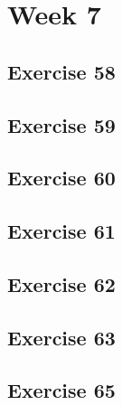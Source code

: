 \documentclass[a4paper]{article}
\let\stdsection\section
\renewcommand\section{\newpage\stdsection}
\begin{document}
\section*{Week 7}

\subsection*{Exercise 58}




\newpage
\subsection*{Exercise 59}


\newpage
\subsection*{Exercise 60}


\newpage
\subsection*{Exercise 61}


\newpage
\subsection*{Exercise 62}


\newpage
\subsection*{Exercise 63}


\newpage
\subsection*{Exercise 65}








\end{document}
